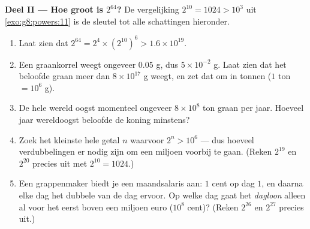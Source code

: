\begin{problem}[{Weekendopgave --- de meetkundige \omterm{def:g1:addition:def}{som}
$1 + 2 + 4 + \dots + 2^{n-1} = 2^n - 1$, van een beroemde legende tot binaire
getallen}]
\medskip
\noindent\textbf{Deel II --- Hoe groot is $2^{64}$?}
De vergelijking $2^{10} = 1024 > 10^3$ uit \cref{exo:g8:powers:11} is de sleutel tot
alle schattingen hieronder.
\begin{enumerate}[resume]
  \item Laat zien dat $2^{64} = 2^4 \times \left(2^{10}\right)^6 > 1.6 \times
        10^{19}$.
  \item Een graankorrel weegt ongeveer $0.05$ g, dus $5 \times 10^{-2}$ g. Laat zien
        dat het beloofde graan meer dan $8 \times 10^{17}$ g weegt, en zet dat om in
        tonnen ($1$ ton $= 10^6$ g).
  \item De hele wereld oogst momenteel ongeveer $8 \times 10^8$ ton graan per jaar.
        Hoeveel jaar wereldoogst beloofde de koning minstens?
  \item Zoek het kleinste hele getal $n$ waarvoor $2^n > 10^6$ --- dus hoeveel
        verdubbelingen er nodig zijn om een miljoen voorbij te gaan. (Reken $2^{19}$ en
        $2^{20}$ precies uit met $2^{10} = 1024$.)
  \item Een grappenmaker biedt je een maandsalaris aan: $1$ cent op dag $1$, en daarna
        elke dag het dubbele van de dag ervoor. Op welke dag gaat het \emph{dagloon}
        alleen al voor het eerst boven een miljoen euro ($10^8$ cent)? (Reken $2^{26}$
        en $2^{27}$ precies uit.)
\end{enumerate}


\end{problem}
